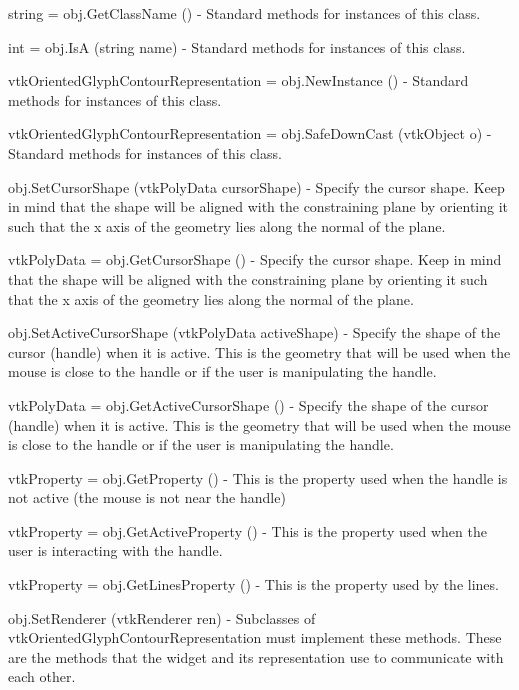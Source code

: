 \begin{DoxyItemize}
\item {\ttfamily string = obj.\-Get\-Class\-Name ()} -\/ Standard methods for instances of this class.  
\item {\ttfamily int = obj.\-Is\-A (string name)} -\/ Standard methods for instances of this class.  
\item {\ttfamily vtk\-Oriented\-Glyph\-Contour\-Representation = obj.\-New\-Instance ()} -\/ Standard methods for instances of this class.  
\item {\ttfamily vtk\-Oriented\-Glyph\-Contour\-Representation = obj.\-Safe\-Down\-Cast (vtk\-Object o)} -\/ Standard methods for instances of this class.  
\item {\ttfamily obj.\-Set\-Cursor\-Shape (vtk\-Poly\-Data cursor\-Shape)} -\/ Specify the cursor shape. Keep in mind that the shape will be aligned with the constraining plane by orienting it such that the x axis of the geometry lies along the normal of the plane.  
\item {\ttfamily vtk\-Poly\-Data = obj.\-Get\-Cursor\-Shape ()} -\/ Specify the cursor shape. Keep in mind that the shape will be aligned with the constraining plane by orienting it such that the x axis of the geometry lies along the normal of the plane.  
\item {\ttfamily obj.\-Set\-Active\-Cursor\-Shape (vtk\-Poly\-Data active\-Shape)} -\/ Specify the shape of the cursor (handle) when it is active. This is the geometry that will be used when the mouse is close to the handle or if the user is manipulating the handle.  
\item {\ttfamily vtk\-Poly\-Data = obj.\-Get\-Active\-Cursor\-Shape ()} -\/ Specify the shape of the cursor (handle) when it is active. This is the geometry that will be used when the mouse is close to the handle or if the user is manipulating the handle.  
\item {\ttfamily vtk\-Property = obj.\-Get\-Property ()} -\/ This is the property used when the handle is not active (the mouse is not near the handle)  
\item {\ttfamily vtk\-Property = obj.\-Get\-Active\-Property ()} -\/ This is the property used when the user is interacting with the handle.  
\item {\ttfamily vtk\-Property = obj.\-Get\-Lines\-Property ()} -\/ This is the property used by the lines.  
\item {\ttfamily obj.\-Set\-Renderer (vtk\-Renderer ren)} -\/ Subclasses of vtk\-Oriented\-Glyph\-Contour\-Representation must implement these methods. These are the methods that the widget and its representation use to communicate with each other.  

\end{DoxyItemize}
